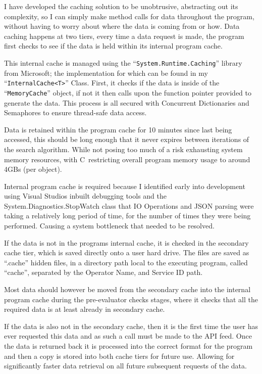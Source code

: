 \documentclass{article}
\newcommand{\CS}{C\nolinebreak\hspace{-.05em}\raisebox{.6ex}{\tiny\bf \#}}
\begin{document}
\par 
I have developed the caching solution to be unobtrusive, abstracting out its complexity, so I can simply make method calls for data throughout the program, without having to worry about where the data is coming from or how. Data caching happens at two tiers, every time a data request is made, the program first checks to see if the data is held within its internal program cache. 

\par
This internal cache is managed using the ``\texttt{System.Runtime.Caching}'' library from Microsoft; the implementation for which can be found in my ``\texttt{InternalCache<T>}'' Class. First, it checks if the data is inside of the ``\texttt{MemoryCache}'' object, if not it then calls upon the function pointer provided to generate the data. This process is all secured with Concurrent Dictionaries and Semaphores to ensure thread-safe data access.


\par 
Data is retained within the program cache for 10 minutes since last being accessed, this should be long enough that it never expires between iterations of the search algorithm. While not posing too much of a risk exhausting system memory resources, with \CS \ restricting overall program memory usage to around 4GBs (per object).


\par 
 Internal program cache is required because I identified early into development using Visual Studios inbuilt debugging tools and the System.Diagnostics.StopWatch class that IO Operations and JSON parsing were taking a relatively long period of time, for the number of times they were being performed. Causing a system bottleneck that needed to be resolved.

\par 
If the data is not in the programs internal cache, it is checked in the secondary cache tier, which is saved directly onto a user hard drive. The files are saved as ``.cache'' hidden files, in a directory path local to the executing program, called ``cache'', separated by the Operator Name, and Service ID path. 

\par 
Most data should however be moved from the secondary cache into the internal program cache during the pre-evaluator checks stages, where it checks that all the required data is at least already in secondary cache.

\par 
If the data is also not in the secondary cache, then it is the first time the user has ever requested this data and as such a call must be made to the API feed. Once the data is returned back it is processed into the correct format for the program and then a copy is stored into both cache tiers for future use. Allowing for significantly faster data retrieval on all future subsequent requests of the data.
\end{document}

